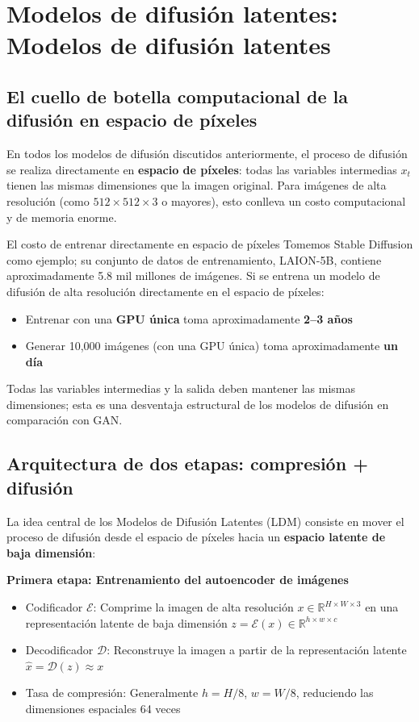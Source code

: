 \section{Modelos de difusión latentes: Modelos de difusión latentes}

\subsection{El cuello de botella computacional de la difusión en espacio de píxeles}

En todos los modelos de difusión discutidos anteriormente, el proceso de difusión se realiza directamente en \textbf{espacio de píxeles}: todas las variables intermedias $x_t$ tienen las mismas dimensiones que la imagen original. Para imágenes de alta resolución (como $512\times512\times3$ o mayores), esto conlleva un costo computacional y de memoria enorme.

\begin{warningbox}{El costo de entrenar directamente en espacio de píxeles}
Tomemos Stable Diffusion como ejemplo; su conjunto de datos de entrenamiento, LAION-5B, contiene aproximadamente 5.8 mil millones de imágenes. Si se entrena un modelo de difusión de alta resolución directamente en el espacio de píxeles:
\begin{itemize}
    \item Entrenar con una \textbf{GPU única} toma aproximadamente \textbf{2--3 años}
    \item Generar 10,000 imágenes (con una GPU única) toma aproximadamente \textbf{un día}
\end{itemize}
Todas las variables intermedias y la salida deben mantener las mismas dimensiones; esta es una desventaja estructural de los modelos de difusión en comparación con GAN.
\end{warningbox}

\subsection{Arquitectura de dos etapas: compresión + difusión}

La idea central de los Modelos de Difusión Latentes (LDM) consiste en mover el proceso de difusión desde el espacio de píxeles hacia un \textbf{espacio latente de baja dimensión}:

\textbf{Primera etapa: Entrenamiento del autoencoder de imágenes}
\begin{itemize}
    \item Codificador $\mathcal{E}$: Comprime la imagen de alta resolución $x \in \mathbb{R}^{H\times W\times 3}$ en una representación latente de baja dimensión $z = \mathcal{E}(x) \in \mathbb{R}^{h\times w\times c}$
    \item Decodificador $\mathcal{D}$: Reconstruye la imagen a partir de la representación latente $\hat{x} = \mathcal{D}(z) \approx x$
    \item Tasa de compresión: Generalmente $h = H/8$, $w = W/8$, reduciendo las dimensiones espaciales 64 veces
\end{itemize}

